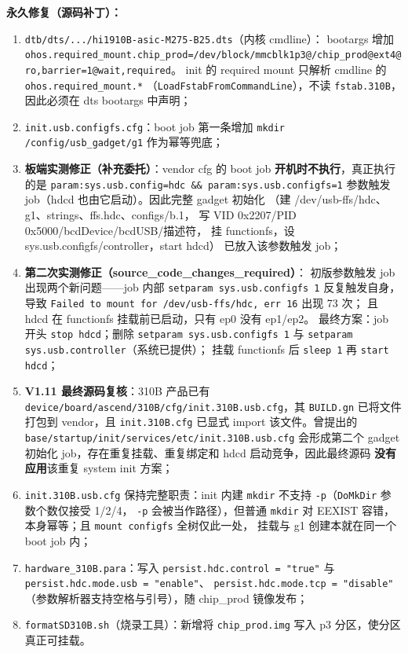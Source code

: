 \textbf{永久修复（源码补丁）：}
\begin{enumerate}
  \item \texttt{dtb/dts/.../hi1910B-asic-M275-B25.dts}（内核 cmdline）：
  bootargs 增加
  \texttt{ohos.required\_mount.chip\_prod=/dev/block/mmcblk1p3@/chip\_prod@ext4@ro,barrier=1@wait,required}。
  init 的 required mount 只解析 cmdline 的 \texttt{ohos.required\_mount.*}
  （\texttt{LoadFstabFromCommandLine}），不读 \texttt{fstab.310B}，
  因此必须在 dts bootargs 中声明；
  \item \texttt{init.usb.configfs.cfg}：boot job 第一条增加
  \texttt{mkdir /config/usb\_gadget/g1} 作为幂等兜底；
  \item \textbf{板端实测修正（补充委托）}：vendor cfg 的 boot job
  \textbf{开机时不执行}，真正执行的是
  \texttt{param:sys.usb.config=hdc \&\& param:sys.usb.configfs=1}
  参数触发 job（hdcd 也由它启动）。因此完整 gadget 初始化
  （建 /dev/usb-ffs/hdc、g1、strings、ffs.hdc、configs/b.1，
  写 VID 0x2207/PID 0x5000/bcdDevice/bcdUSB/描述符，
  挂 functionfs，设 sys.usb.configfs/controller，start hdcd）
  已放入该参数触发 job；
  \item \textbf{第二次实测修正（source\_code\_changes\_required）}：
  初版参数触发 job 出现两个新问题——job 内部
  \texttt{setparam sys.usb.configfs 1} 反复触发自身，导致
  \texttt{Failed to mount for /dev/usb-ffs/hdc, err 16} 出现 73 次；
  且 hdcd 在 functionfs 挂载前已启动，只有 ep0 没有 ep1/ep2。
  最终方案：job 开头 \texttt{stop hdcd}；删除
  \texttt{setparam sys.usb.configfs 1} 与
  \texttt{setparam sys.usb.controller}（系统已提供）；
  挂载 functionfs 后 \texttt{sleep 1} 再 \texttt{start hdcd}；
  \item \textbf{V1.11 最终源码复核}：310B 产品已有
  \texttt{device/board/ascend/310B/cfg/init.310B.usb.cfg}，其
  \texttt{BUILD.gn} 已将文件打包到 vendor，且
  \texttt{init.310B.cfg} 已显式 import 该文件。曾提出的
  \texttt{base/startup/init/services/etc/init.310B.usb.cfg} 会形成第二个
  gadget 初始化 job，存在重复挂载、重复绑定和 hdcd 启动竞争，因此最终源码
  \textbf{没有应用}该重复 system init 方案；
  \item \texttt{init.310B.usb.cfg} 保持完整职责：init 内建 \texttt{mkdir}
  不支持 \texttt{-p}（\texttt{DoMkDir} 参数个数仅接受 1/2/4，
  \texttt{-p} 会被当作路径），但普通 \texttt{mkdir} 对 EEXIST 容错，
  本身幂等；且 \texttt{mount configfs} 全树仅此一处，
  挂载与 g1 创建本就在同一个 boot job 内；
  \item \texttt{hardware\_310B.para}：写入
  \texttt{persist.hdc.control = "true"} 与
  \texttt{persist.hdc.mode.usb = "enable"}、
  \texttt{persist.hdc.mode.tcp = "disable"}
  （参数解析器支持空格与引号），随 chip\_prod 镜像发布；
  \item \texttt{formatSD310B.sh}（烧录工具）：新增将
  \texttt{chip\_prod.img} 写入 p3 分区，使分区真正可挂载。
\end{enumerate}

